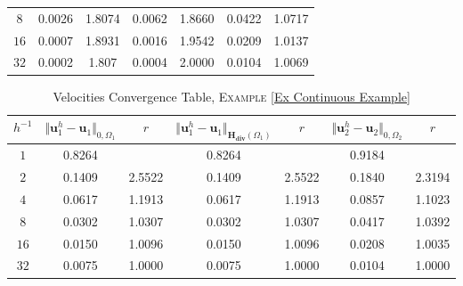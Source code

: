 \documentclass[3p]{elsarticle}
\def\uone{\mathbf{u}_{1}}
\def\utwo{\mathbf{u}_{2}}
\def\Hdiv{\mathbf{H_{div}}}
\begin{document}
\begin{example}
\begin{table}[h!]
\begin{center}
\begin{tabular}{ c c c c c c c }
$ 8 $  &  0.0026  &    1.8074 &  0.0062  & 1.8660   &  0.0422  &  1.0717    \\ 
%
$ 16 $  &  0.0007  &     1.8931 &  0.0016  & 1.9542    &  0.0209  &  1.0137 \\ 
%
$ 32 $  &  0.0002  &     1.807  &  0.0004  & 2.0000   &  0.0104   &   1.0069  \\ 
%
    \hline
\end{tabular}
\end{center}
%
\end{table}
%
%
\begin{table*}[h!]
\caption{Velocities Convergence Table, \textsc{Example} \ref{Ex Continuous Example} }\label{Table Velocity Approximation}
\def\arraystretch{1.4}
\begin{center}
\begin{tabular}{ c c c c c c c }
    \hline
    \rowcolor{gray!50}
$ h^{-1} $  
& $\Vert  \uone^{h}- \uone  \Vert_{ 0, \Omega_{1} } $ 
& $r$  
& $\Vert  \uone^{h}- \uone  \Vert_{\Hdiv(\Omega_{1})}$ 
& $r$
& $\Vert  \utwo^{h}- \utwo  \Vert_{ 0, \Omega_{2} } $ 
& $r$ \\ %
    \toprule
$ 1 $ &   0.8264 &    &   0.8264  &  &   0.9184  & \\
$ 2 $  &   0.1409  & 2.5522   &  0.1409  &  2.5522   &  0.1840   &  2.3194 \\
$ 4 $ &   0.0617  &   1.1913  &  0.0617  &   1.1913  &  0.0857   &  1.1023  \\
$ 8 $  &  0.0302  &   1.0307  &  0.0302  &   1.0307   &   0.0417 &  1.0392   \\ 
%
$ 16 $  &  0.0150  &  1.0096  &  0.0150  &  1.0096   &  0.0208  &  1.0035   \\ 
%
$ 32 $  &  0.0075  & 1.0000  &  0.0075   &  1.0000   &  0.0104  &  1.0000   \\ 
%
    \hline
\end{tabular}
\end{center}
%
\end{table*}
%
\end{example}
%
%
%
%
%
\end{document}
